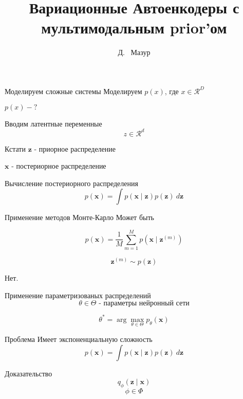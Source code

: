 \documentclass{beamer}
\title{Вариационные Автоенкодеры с мультимодальным prior'ом}
\author{Д. ~Мазур}
\institute[Гимназия 1505] 
{
  10 Б класс\\
  Школа 1505 "Преображенская"
 }
\begin{document}
    \begin{frame}
      \titlepage
    \end{frame}
    
    \begin{frame}{Моделируем сложные системы}{}
        Моделируем $p(x)$, где $x \in \mathcal{R}^D$ \pause

        $p(x) - ?$
    \end{frame}

    \begin{frame}{Вводим латентные переменные}{}
        $$z \in \mathcal{R}^d$$
    \end{frame}

    \begin{frame}{Кстати}{}
        $\mathbf{z}$ - приорное распределение

        $\mathbf{x}$ - постериорное распределение
    \end{frame}

    \begin{frame}{Вычисление постериорного распределения}{}
        $$p(\mathbf{x}) = \int p(\mathbf{x} \mid \mathbf{z}) p(\mathbf{z}) ~d \mathbf{z}$$
    \end{frame}

    \begin{frame}{Применение методов Монте-Карло}{}
        Может быть 
        
        $$p(\mathbf{x}) = \frac{1}{M} \sum_{m=1}^{M} p(\mathbf{x} \mid \mathbf{z}^{(m)})$$

        $$\mathbf{z}^{(m)} \sim p(\mathbf{z})$$
        \pause

        Нет.
    \end{frame}

    \begin{frame}{Применение параметризованых распределений}{}
        $$\theta \in \Theta \text{ - параметры нейронный сети}$$

        $$\theta^* = \arg \max_{\theta \in \Theta} p_{\theta}(\mathbf{x}) $$
    \end{frame}

    \begin{frame}{Проблема}{}
        Имеет экспоненциальную сложность
        $$p(\mathbf{x}) = \int p(\mathbf{x} \mid \mathbf{z}) p(\mathbf{z}) ~d \mathbf{z}$$
    \end{frame}

    \begin{frame}{Доказательство}{}
        $$q_\phi(\mathbf{z} \mid \mathbf{x})$$
        $$\phi \in \Phi$$
    \end{frame}
\end{document}

